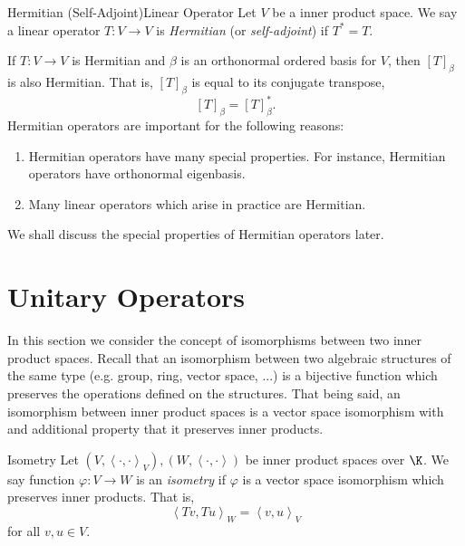 \documentclass[linearalgebraII]{subfiles}
\begin{document}
    \begin{definition}{Hermitian (Self-Adjoint)}{Linear Operator}
        Let $V$ be a inner product space. We say a linear operator $T:V\to V$ is \emph{Hermitian} (or \emph{self-adjoint}) if $T^* = T$.
    \end{definition}

    \noindent If $T:V\to V$ is Hermitian and $\beta$ is an orthonormal ordered basis for $V$, then $\left[ T \right] _\beta$ is also Hermitian. That is, $\left[ T \right] _\beta$ is equal to its conjugate transpose,
    \begin{equation*}
        \left[ T \right] _\beta = \left[ T \right] _\beta^*.
    \end{equation*}
    Hermitian operators are important for the following reasons:
    \begin{enumerate}
        \item Hermitian operators have many special properties. For instance, Hermitian operators have orthonormal eigenbasis.
        \item Many linear operators which arise in practice are Hermitian.
    \end{enumerate}
    We shall discuss the special properties of Hermitian operators later.

    \section{Unitary Operators}
    
    \begin{remark}
        In this section we consider the concept of isomorphisms between two inner product spaces. Recall that an isomorphism between two algebraic structures of the same type (e.g. group, ring, vector space, ...) is a bijective function which preserves the operations defined on the structures. That being said, an isomorphism between inner product spaces is a vector space isomorphism with and additional property that it preserves inner products.
    \end{remark}

    \begin{definition}{Isometry}{}
        Let $\left( V, \left\langle \cdot, \cdot\right\rangle _V \right), \left( W,\left\langle \cdot, \cdot\right\rangle  \right)$ be inner product spaces over $\K$. We say function $\varphi:V\to W$ is an \emph{isometry} if $\varphi$ is a vector space isomorphism which preserves inner products. That is,
        \begin{equation*}
            \left\langle Tv, Tu\right\rangle _W = \left\langle v, u\right\rangle _V
        \end{equation*}
        for all $v,u\in V$.
    \end{definition}
\end{document}
